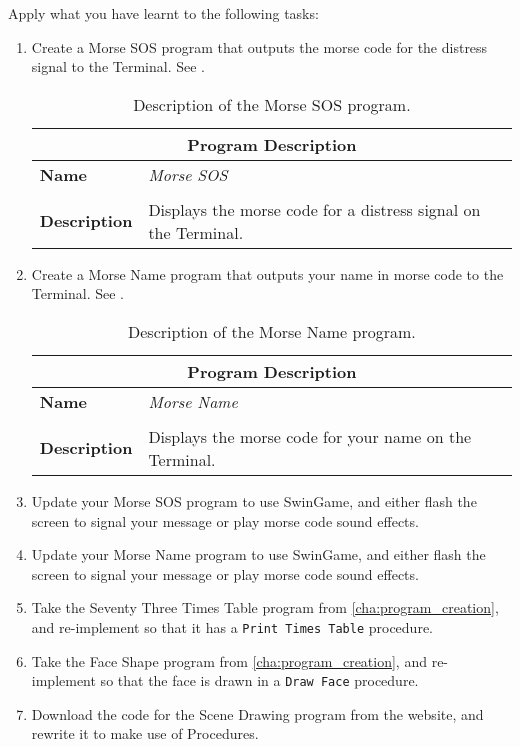 \bigskip
Apply what you have learnt to the following tasks:
\begin{enumerate}
  \item Create a Morse SOS program that outputs the morse code for the distress signal to the Terminal. See .
  
  \begin{table}[h]
  \centering
  \begin{tabular}{l|p{10cm}}
    \hline
    \multicolumn{2}{c}{\textbf{Program Description}} \\
    \hline
    \textbf{Name} & \emph{Morse SOS} \\
    \\
    \textbf{Description} & Displays the morse code for a distress signal on the Terminal. \\
    \hline
  \end{tabular}
  \caption{Description of the Morse SOS program.}
  \label{tbl:procedure-decl-morse_sos}
  \end{table}
  
  \item Create a Morse Name program that outputs your name in morse code to the Terminal. See .
  
  \begin{table}[h]
  \centering
  \begin{tabular}{l|p{10cm}}
    \hline
    \multicolumn{2}{c}{\textbf{Program Description}} \\
    \hline
    \textbf{Name} & \emph{Morse Name} \\
    \\
    \textbf{Description} & Displays the morse code for your name on the Terminal. \\
    \hline
  \end{tabular}
  \caption{Description of the Morse Name program.}
  \label{tbl:procedure-decl-morse_name}
  \end{table}
  
  \item Update your Morse SOS program to use SwinGame, and either flash the screen to signal your message or play morse code sound effects.
  \item Update your Morse Name program to use SwinGame, and either flash the screen to signal your message or play morse code sound effects.
  
  \item Take the Seventy Three Times Table program from \cref{cha:program_creation}, and re-implement so that it has a \texttt{Print Times Table} procedure.
  \item Take the Face Shape program from \cref{cha:program_creation}, and re-implement so that the face is drawn in a \texttt{Draw Face} procedure.
  \item Download the code for the Scene Drawing program from the website, and rewrite it to make use of Procedures.
\end{enumerate}


